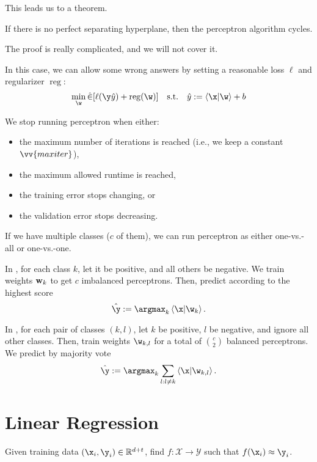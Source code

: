 \documentclass[class=cs480,notes,tikz]{agony}
\begin{document}
This leads us to a theorem.

\begin{theorem}\label{thm:perceptron-fail}
  If there is no perfect separating hyperplane, then the perceptron algorithm cycles.
\end{theorem}

The proof is really complicated, and we will not cover it.

In this case, we can allow some wrong answers by setting a reasonable
loss $\ell$ and regularizer $\operatorname{reg}$:
\[ \min_{\w} \hat{\E}[\ell(\y\hat y) + \operatorname{reg}(\w)] \qq{s.t.} \hat y := \ip{\x}{\w} + b \]

We stop running perceptron when either:
\begin{itemize}[nosep]
  \item the maximum number of iterations is reached (i.e., we keep a constant $\vv{maxiter}$),
  \item the maximum allowed runtime is reached,
  \item the training error stops changing, or
  \item the validation error stops decreasing.
\end{itemize}

If we have multiple classes ($c$ of them),
we can run perceptron as either one-vs.-all or one-vs.-one.

In , for each class $k$,
let it be positive, and all others be negative.
We train weights $\vb w_k$ to get $c$ imbalanced perceptrons.
Then, predict according to the highest score
\[ \hat\y := \argmax_k \ip{\x}{\w_k}. \]

In , for each pair of classes $(k,l)$,
let $k$ be positive, $l$ be negative, and ignore all other classes.
Then, train weights $\w_{k,l}$ for a total of $\binom{c}{2}$ balanced perceptrons.
We predict by majority vote
\[ \hat\y := \argmax_k \sum_{l:l\neq k} \ip{\x}{\w_{k,l}}. \]

\section{Linear Regression}


\begin{problem}[regression]
  Given training data $(\x_i,\y_i) \in \R^{d+t}$, find $f : \mathcal X \to \mathcal Y$
  such that $f(\x_i) \approx \y_i$.
\end{problem}
\end{document}
